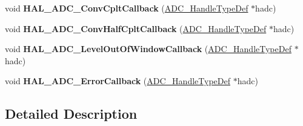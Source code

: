 \begin{DoxyCompactItemize}
\item 
void {\bfseries H\+A\+L\+\_\+\+A\+D\+C\+\_\+\+Conv\+Cplt\+Callback} (\hyperlink{struct_a_d_c___handle_type_def}{A\+D\+C\+\_\+\+Handle\+Type\+Def} $\ast$hadc)\hypertarget{group___a_d_c___exported___functions___group2_gaf20a88180db1113be1e89266917d148b}{}\label{group___a_d_c___exported___functions___group2_gaf20a88180db1113be1e89266917d148b}

\item 
void {\bfseries H\+A\+L\+\_\+\+A\+D\+C\+\_\+\+Conv\+Half\+Cplt\+Callback} (\hyperlink{struct_a_d_c___handle_type_def}{A\+D\+C\+\_\+\+Handle\+Type\+Def} $\ast$hadc)\hypertarget{group___a_d_c___exported___functions___group2_gad7e3dafc08886b97b9c9e23267645b9e}{}\label{group___a_d_c___exported___functions___group2_gad7e3dafc08886b97b9c9e23267645b9e}

\item 
void {\bfseries H\+A\+L\+\_\+\+A\+D\+C\+\_\+\+Level\+Out\+Of\+Window\+Callback} (\hyperlink{struct_a_d_c___handle_type_def}{A\+D\+C\+\_\+\+Handle\+Type\+Def} $\ast$hadc)\hypertarget{group___a_d_c___exported___functions___group2_ga8cf5c59c6355fe7cf3c10816c761b9c2}{}\label{group___a_d_c___exported___functions___group2_ga8cf5c59c6355fe7cf3c10816c761b9c2}

\item 
void {\bfseries H\+A\+L\+\_\+\+A\+D\+C\+\_\+\+Error\+Callback} (\hyperlink{struct_a_d_c___handle_type_def}{A\+D\+C\+\_\+\+Handle\+Type\+Def} $\ast$hadc)\hypertarget{group___a_d_c___exported___functions___group2_gadea1a55c5199d5cb4cfc1fdcd32be1b2}{}\label{group___a_d_c___exported___functions___group2_gadea1a55c5199d5cb4cfc1fdcd32be1b2}

\end{DoxyCompactItemize}


\subsection{Detailed Description}
